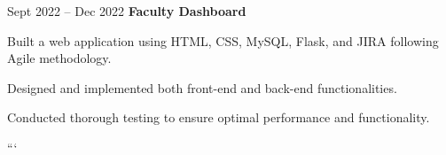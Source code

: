 \vspace{0.2 cm}
\begin{twocolentry}{
        Sept 2022 -- Dec 2022
    }
        \textbf{Faculty Dashboard}\end{twocolentry}
    \vspace{0.10 cm}
    \begin{onecolentry}
        \begin{highlights}
            \item Built a web application using HTML, CSS, MySQL, Flask, and JIRA following Agile methodology.
            \item Designed and implemented both front-end and back-end functionalities.
            \item Conducted thorough testing to ensure optimal performance and functionality.
        \end{highlights}
    \end{onecolentry}
```

